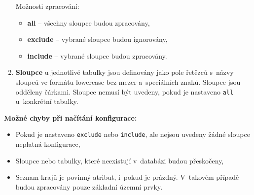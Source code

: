 \begin{enumerate}
    Možnosti zpracování:
    \begin{itemize}
        \item \textbf{all} -- všechny sloupce budou zpracovány,
        \item \textbf{exclude} -- vybrané sloupce budou ignorovány,
        \item \textbf{include} -- vybrané sloupce budou zpracovány.
    \end{itemize}

    \item \textbf{Sloupce} u jednotlivé tabulky jsou definovány jako pole řetězců s~názvy sloupců 
    ve formátu lowercase bez mezer a~speciálních znaků. Sloupce jsou odděleny čárkami.
    Sloupce nemusí být uvedeny, pokud je nastaveno \texttt{all} u~konkrétní tabulky.
\end{enumerate}

\textbf{Možné chyby při načítání konfigurace:}
\begin{itemize}
    \item Pokud je nastaveno \texttt{exclude} nebo \texttt{include}, ale nejsou uvedeny žádné sloupce \textrightarrow{} neplatná konfigurace,
    \item Sloupce nebo tabulky, které neexistují v~databázi \textrightarrow{} budou přeskočeny,
    \item Seznam krajů je povinný atribut, i~pokud je prázdný. V~takovém případě budou zpracovány pouze základní územní prvky.
\end{itemize}
